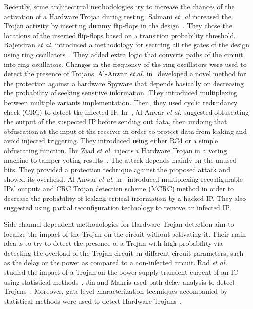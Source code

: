 \documentclass[conference]{IEEEtran}
\begin{document}
Recently, some architectural methodologies try to increase the chances of the activation of a Hardware Trojan during testing. Salmani \textit{et. al} increased the Trojan activity by inserting dummy flip-flops in the design{\color{blue}~\cite{conf:Sal2009}}. They chose the locations of the inserted flip-flops based on a transition probability threshold. Rajendran \textit{et al.} introduced a methodology for securing all the gates of the design using ring oscillators{\color{blue}~\cite{conf:Raj2011}}. They added extra logic that converts paths of the circuit into ring oscillators. Changes in the frequency of the ring oscillators were used to detect the presence of Trojans. Al-Anwar \textit{et al.} in{\color{blue}~\cite{conf:Spyware}} developed a novel method for the protection against a hardware Spyware that depends basically on decreasing the probability of seeking sensitive information. They introduced multiplexing between multiple variants implementation. Then, they used cyclic redundancy check (CRC) to detect the infected IP. In{\color{blue}~\cite{conf:Euro}}, Al-Anwar \textit{et al.} suggested obfuscating the output of the suspected IP before sending out data, then undoing that obfuscation at the input of the receiver in order to protect data from leaking and avoid injected triggering. They introduced using either RC4 or a simple obfuscating function. Ibn Ziad \textit{et al.} injects a Hardware Trojan in a voting machine to tamper voting results{\color{blue}~\cite{conf:voting}}. The attack depends mainly on the unused bits. They provided a protection technique against the proposed attack and showed its overhead. Al-Anwar \textit{et al.} in{\color{blue}~\cite{conf:canada}} introduced multiplexing reconfigurable IPs' outputs and CRC Trojan detection scheme (MCRC) method in order to decrease the probability of leaking critical information by a hacked IP. They also suggested using partial reconfiguration technology to remove an infected IP. 

 
Side-channel dependent methodologies for Hardware Trojan detection aim to localize the impact of the Trojan on the circuit without activating it. Their main idea is to try to detect the presence of a Trojan with high probability via detecting the overload of the Trojan circuit on different circuit parameters; such as the delay or the power as compared to a non-infected circuit. Rad \textit{et al.} studied the impact of a Trojan on the power supply transient current of an IC using statistical methods{\color{blue}~\cite{journal:Rad2010}}. Jin and Makris used path delay analysis to detect Trojans{\color{blue}~\cite{conf:Jin2008}}. Moreover, gate-level characterization techniques accompanied by statistical methods were used to detect Hardware Trojans{\color{blue}~\cite{journal:Wei2011}}. 
\end{document}
